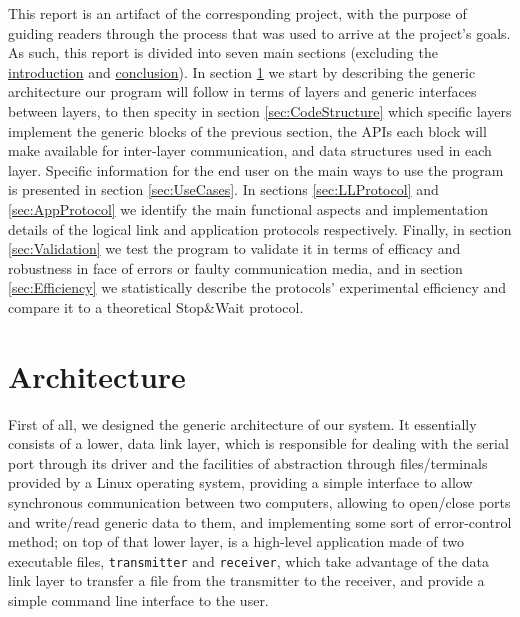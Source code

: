\documentclass[a4paper, 11pt]{report}
\begin{document}
This report is an artifact of the corresponding project, with the purpose of guiding readers through the process that was used to arrive at the project's goals. As such, this report is divided into seven main sections (excluding the \hyperref[sec:Introduction]{introduction} and \hyperref[sec:Conclusion]{conclusion}). In section \ref{sec:Architecture} we start by describing the generic architecture our program will follow in terms of layers and generic interfaces between layers, to then specity in section \ref{sec:CodeStructure} which specific layers implement the generic blocks of the previous section, the APIs each block will make available for inter-layer communication, and data structures used in each layer. Specific information for the end user on the main ways to use the program is presented in section \ref{sec:UseCases}. In sections \ref{sec:LLProtocol} and \ref{sec:AppProtocol} we identify the main functional aspects and implementation details of the logical link and application protocols respectively. Finally, in section \ref{sec:Validation} we test the program to validate it in terms of efficacy and robustness in face of errors or faulty communication media, and in section \ref{sec:Efficiency} we statistically describe the protocols' experimental efficiency and compare it to a theoretical Stop\&Wait protocol.

\section{Architecture} \label{sec:Architecture}

First of all, we designed the generic architecture of our system. It essentially consists of a lower, data link layer, which is responsible for dealing with the serial port through its driver and the facilities of abstraction through files/terminals provided by a Linux operating system, providing a simple interface to allow synchronous communication between two computers, allowing to open/close ports and write/read generic data to them, and implementing some sort of error-control method; on top of that lower layer, is a high-level application made of two executable files, \texttt{transmitter} and \texttt{receiver}, which take advantage of the data link layer to transfer a file from the transmitter to the receiver, and provide a simple command line interface to the user.
\end{document}
